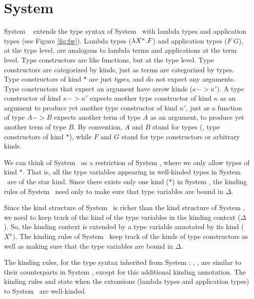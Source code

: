 \section{System \Fw} \label{sec:fw}
System \Fw\ \cite{Gir72} extends the type syntax of System \F\ with lambda types
and application types (see Figure \ref{fig:fw}). Lambda types ($\lambda X^\kappa.F$)
and application types ($F\;G$), at the type level, are analogous to lambda terms
and applications at the term level. Type constructors are like functions, but
at the type level. Type constructors are categorized by kinds, just as terms
are categorized by types. Type constructors of kind $*$ are just \emph{types},
and do not expect any arguments. Type constructors that expect an argument
have arrow kinds ($\kappa -> \kappa'$). A type constructor of kind
$\kappa -> \kappa'$ expects another type constructor of kind $\kappa$
as an argument to produce yet another type constructor of kind $\kappa'$,
just as a function of type $A -> B$ expects another term of type $A$
as an argument, to produce yet another term of type $B$. By convention,
$A$ and $B$ stand for types (\ie, type constructors of kind $*$),
while $F$ and $G$ stand for type constructors or arbitrary kinds.

We can think of System \F\ as a restriction of System \Fw, where we only
allow types of kind $*$. That is, all the type variables appearing in
well-kinded types in System \F\ are of the star kind. Since there exists only
one kind ($*$) in System \F, the kinding rules of System \F\ need only to make
sure that type variables are bound in $\Delta$.

Since the kind structure of System \Fw\ is richer than the kind structure of
System \F, we need to keep track of the kind of the type variables in
the kinding context ($\Delta$). So, the kinding context is extended by
a type variable annotated by its kind ($X^\kappa$). The kinding rules of
System \Fw\ keep track of the kinds of type constructors as well as making
sure that the type variables are bound in $\Delta$.

The kinding rules, for the type syntax inherited from System \F:
, ,  are similar to
their counterparts in System \F, except for this additional kinding annotation.
The kinding rules  and  state when the extensions
(lambda types and application types) to System \F\ are well-kinded.

